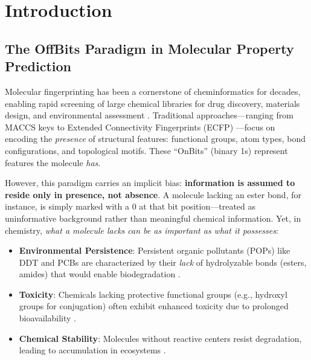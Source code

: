 \documentclass[11pt,letterpaper]{article}
\begin{document}
\newpage
\tableofcontents
\newpage

\section{Introduction}

\subsection{The OffBits Paradigm in Molecular Property Prediction}

Molecular fingerprinting has been a cornerstone of cheminformatics for decades, enabling rapid screening of large chemical libraries for drug discovery, materials design, and environmental assessment \cite{cereto2015molecular, muegge2016overview}. Traditional approaches—ranging from MACCS keys \cite{durant2002reoptimization} to Extended Connectivity Fingerprints (ECFP) \cite{Rogers2010}—focus on encoding the \textit{presence} of structural features: functional groups, atom types, bond configurations, and topological motifs. These ``OnBits'' (binary 1s) represent features the molecule \textit{has}.

However, this paradigm carries an implicit bias: \textbf{information is assumed to reside only in presence, not absence}. A molecule lacking an ester bond, for instance, is simply marked with a 0 at that bit position—treated as uninformative background rather than meaningful chemical information. Yet, in chemistry, \textit{what a molecule lacks can be as important as what it possesses}:

\begin{itemize}
    \item \textbf{Environmental Persistence}: Persistent organic pollutants (POPs) like DDT and PCBs are characterized by their \textit{lack} of hydrolyzable bonds (esters, amides) that would enable biodegradation \cite{breivik2004towards, jones1999persistent}.
    \item \textbf{Toxicity}: Chemicals lacking protective functional groups (e.g., hydroxyl groups for conjugation) often exhibit enhanced toxicity due to prolonged bioavailability \cite{parkinson2015biotransformation}.
    \item \textbf{Chemical Stability}: Molecules without reactive centers resist degradation, leading to accumulation in ecosystems \cite{schwarzenbach2003challenge}.
\end{itemize}
\end{document}
